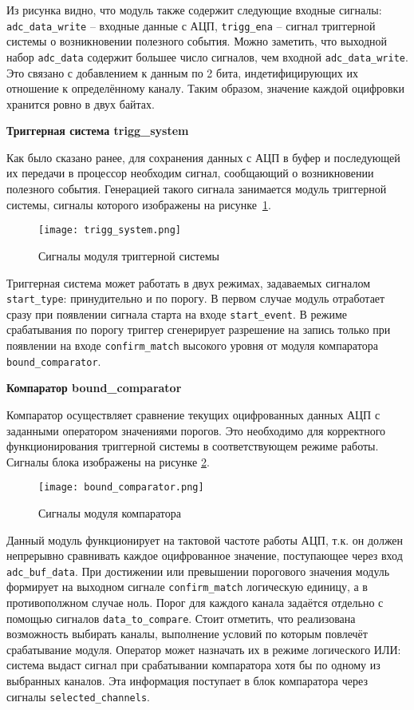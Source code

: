 Из рисунка видно, что модуль также содержит следующие входные сигналы: \texttt{adc\_data\_write} -- входные данные с АЦП, \texttt{trigg\_ena} -- сигнал триггерной системы о возникновении полезного события. Можно заметить, что выходной набор \texttt{adc\_data} содержит большее число сигналов, чем входной \texttt{adc\_data\_write}. Это связано с добавлением к данным по 2 бита, индетифицирующих их отношение к определённому каналу. Таким образом, значение каждой оцифровки хранится ровно в двух байтах.\par
\textbf{Триггерная система trigg\_system}\par
Как было сказано ранее, для сохранения данных с АЦП в буфер и последующей их передачи в процессор необходим сигнал, сообщающий о возникновении полезного события. Генерацией такого сигнала занимается модуль триггерной системы, сигналы которого изображены на рисунке~\ref{fig:trigg_system}.\par
\begin{figure}[ht]
    \centering
    \texttt{[image: trigg\_system.png]}
    \caption{Сигналы модуля триггерной системы}
    \label{fig:trigg_system}
\end{figure}
Триггерная система может работать в двух режимах, задаваемых сигналом \texttt{start\_type}: принудительно и по порогу. В первом случае модуль отработает сразу при появлении сигнала старта на входе \texttt{start\_event}. В режиме срабатывания по порогу триггер сгенерирует разрешение на запись только при появлении на входе \texttt{confirm\_match} высокого уровня от модуля компаратора \texttt{bound\_comparator}.\par
\textbf{Компаратор bound\_comparator}\par
Компаратор осуществляет сравнение текущих оцифрованных данных АЦП с заданными оператором значениями порогов. Это необходимо для корректного функционирования триггерной системы в соответствующем режиме работы. Сигналы блока изображены на рисунке \ref{fig:bound_comparator}.\par
\begin{figure}[ht]
    \centering
    \texttt{[image: bound\_comparator.png]}
    \caption{Сигналы модуля компаратора}
    \label{fig:bound_comparator}
\end{figure}
Данный модуль функционирует на тактовой частоте работы АЦП, т.к. он должен непрерывно сравнивать каждое оцифрованное значение, поступающее через вход \texttt{adc\_buf\_data}. При достижении или превышении порогового значения модуль формирует на выходном сигнале \texttt{confirm\_match} логическую единицу, а в противополжном случае ноль. Порог для каждого канала задаётся отдельно с помощью сигналов \texttt{data\_to\_compare}. Стоит отметить, что реализована возможность выбирать каналы, выполнение условий по которым повлечёт срабатывание модуля. Оператор может назначать их в режиме логического ИЛИ: система выдаст сигнал при срабатывании компаратора хотя бы по одному из выбранных каналов. Эта информация поступает в блок компаратора через сигналы \texttt{selected\_channels}.\par
